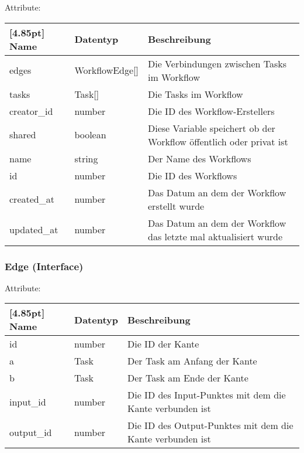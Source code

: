     		Attribute:
            \begin{center}
            	\renewcommand{\arraystretch}{1.5}
                \setlength\tabcolsep{5pt}
            	\begin{tabularx}{\textwidth}{|l|l|X|}
            		\hline
                    \rowcolor[gray]{0.75}[4.85pt]            		
                    Name & Datentyp & Beschreibung \\ \hline
                    edges & WorkflowEdge[] & Die Verbindungen zwischen Tasks im Workflow \\ \hline
                    tasks & Task[] & Die Tasks im Workflow \\ \hline
                    creator_id & number & Die ID des Workflow-Erstellers \\ \hline
                    shared & boolean & Diese Variable speichert ob der Workflow öffentlich oder privat ist \\ \hline
                    name & string & Der Name des Workflows \\ \hline
                    id & number & Die ID des Workflows \\ \hline
                    created_at & number & Das Datum an dem der Workflow erstellt wurde \\ \hline
                    updated_at & number & Das Datum an dem der Workflow das letzte mal aktualisiert wurde \\ \hline
            	\end{tabularx}
            \end{center}
                
            \subsubsection{Edge (Interface)}
    		
    		Attribute:
            \begin{center}
            	\renewcommand{\arraystretch}{1.5}
                \setlength\tabcolsep{5pt}
            	\begin{tabularx}{\textwidth}{|l|l|X|}
            		\hline
                    \rowcolor[gray]{0.75}[4.85pt]            		
                    Name & Datentyp & Beschreibung \\ \hline
                     id & number & Die ID der Kante \\ \hline
                     a & Task & Der Task am Anfang der Kante \\ \hline
                     b & Task & Der Task am Ende der Kante \\ \hline
                     input_id & number & Die ID des Input-Punktes mit dem die Kante verbunden ist \\ \hline
                     output_id & number & Die ID des Output-Punktes mit dem die Kante verbunden ist \\ \hline
            	\end{tabularx}
            \end{center}
            

